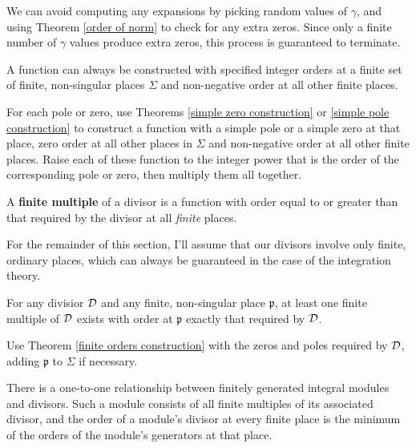 We can avoid computing any expansions by picking random values of
$\gamma$, and using Theorem \ref{order of norm} to check for any extra
zeros.  Since only a finite number of $\gamma$ values produce extra
zeros, this process is guaranteed to terminate.


\endtheorem

\theorem
\label{finite orders construction}

A function can always be constructed with specified integer orders at
a finite set of finite, non-singular places $\Sigma$ and non-negative
order at all other finite places.

\proof

For each pole or zero, use Theorems \ref{simple zero construction} or
\ref{simple pole construction} to construct a function with a simple
pole or a simple zero at that place, zero order at all other places in
$\Sigma$ and non-negative order at all other finite places.  Raise
each of these function to the integer power that is the order of the
corresponding pole or zero, then multiply them all together.

\endtheorem


A {\bf finite multiple} of a divisor is a function with order equal to
or greater than that required by the divisor at all {\it finite} places.

\enddefinition

For the remainder of this section, I'll assume that our divisors
involve only finite, ordinary places, which can always be guaranteed
in the case of the integration theory.

\theorem
\label{exact order existance}

For any divisior ${\cal D}$ and any finite, non-singular place
$\mathfrak{p}$, at least one finite multiple of ${\cal D}$ exists with
order at $\mathfrak{p}$ exactly that required by ${\cal D}$.

\proof

Use Theorem \ref{finite orders construction} with the zeros and poles
required by ${\cal D}$, adding $\mathfrak{p}$
to $\Sigma$ if necessary.

\endtheorem

\theorem
\label{divisor-module isomorphism}

There is a one-to-one relationship between finitely generated integral
modules and divisors.  Such a module consists of all finite multiples
of its associated divisor, and the order of a module's divisor at
every finite place is the minimum of the orders of the module's
generators at that place.

